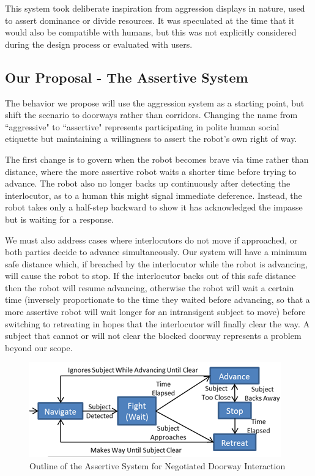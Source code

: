 \documentclass[letterpaper, 10 pt, conference]{ieeeconf}  %
\begin{document}
This system took deliberate inspiration from aggression displays in nature, used to assert dominance or divide resources. It was speculated at the time that it would also be compatible with humans, but this was not explicitly considered during the design process or evaluated with users. 


\subsection{Our Proposal - The Assertive System}

The behavior we propose will use the aggression system as a starting point, but shift the scenario to doorways rather than corridors. Changing the name from ``aggressive" to ``assertive" represents participating in polite human social etiquette but maintaining a willingness to assert the robot’s own right of way.

The first change is to govern when the robot becomes brave via time rather than distance, where the more assertive robot waits a shorter time before trying to advance. The robot also no longer backs up continuously after detecting the interlocutor, as to a human this might signal immediate deference. Instead, the robot takes only a half-step backward to show it has acknowledged the impasse but is waiting for a response. 

We must also address cases where interlocutors do not move if approached, or both parties decide to advance simultaneously. Our system will have a minimum safe distance which, if breached by the interlocutor while the robot is advancing, will cause the robot to stop. If the interlocutor backs out of this safe distance then the robot will resume advancing, otherwise the robot will wait a certain time (inversely proportionate to the time they waited before advancing, so that a more assertive robot will wait longer for an intransigent subject to move) before switching to retreating in hopes that the interlocutor will finally clear the way. A subject that cannot or will not clear the blocked doorway represents a problem beyond our scope. 
 
    \begin{figure}
      \centering
      \includegraphics{assertive_behavior.png}
      \caption{Outline of the Assertive System for Negotiated Doorway Interaction}
      \label{fig:Assertive}
   \end{figure}
 
\end{document}
